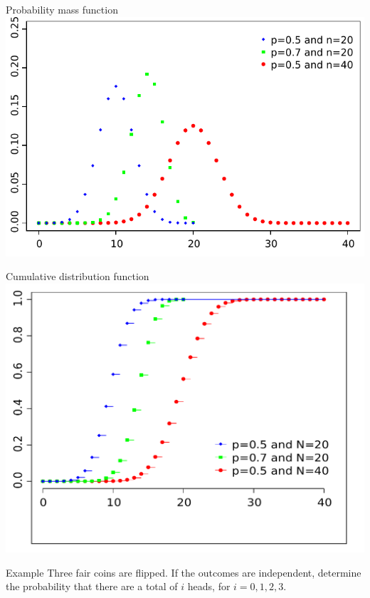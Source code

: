 \documentclass{beamer}
\begin{document}
\begin{frame}{Probability mass function}
  \includegraphics[width=\linewidth]{Binomial_distribution_pmf}
\end{frame}

\begin{frame}{Cumulative distribution function}
  \includegraphics[width=\linewidth]{Binomial_distribution_cdf}
\end{frame}

\begin{frame}[t]{Example}
  Three fair coins are flipped. If the outcomes are independent, determine the
  probability that there are a total of $i$ heads, for $i = 0, 1, 2, 3$.
\end{frame}
\end{document}
